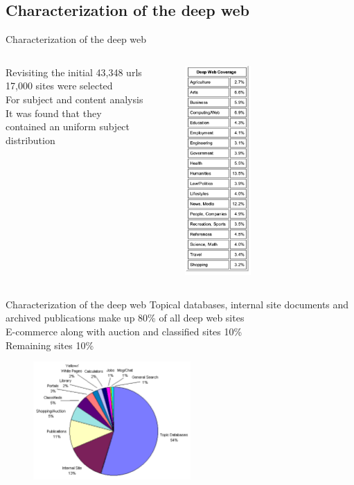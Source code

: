 \documentclass{beamer}
\begin{document}
\subsection{Characterization of the deep web}
\begin{frame}[fragile]{Characterization of the deep web}
\begin{columns}[T,onlytextwidth]
	Revisiting the initial 43,348 urls \\
	17,000 sites were selected \\ 
	For subject and content analysis \\
	It was found that they  \\
	contained an uniform subject \\
	distribution  \\
  		\begin{figure}
			\includegraphics[height=8cm]{dwsubj.png}
		\end{figure}
  \end{columns}

\end{frame}
\begin{frame}[fragile]{Characterization of the deep web}
Topical databases, internal site documents and archived publications make up 80\% of all deep web sites\\
E-commerce along with auction and classified sites 10\% \\
Remaining sites 10\% 
\begin{figure}
			\includegraphics[width=6cm]{dwct.png}
		\end{figure}
\end{frame}
\end{document}
